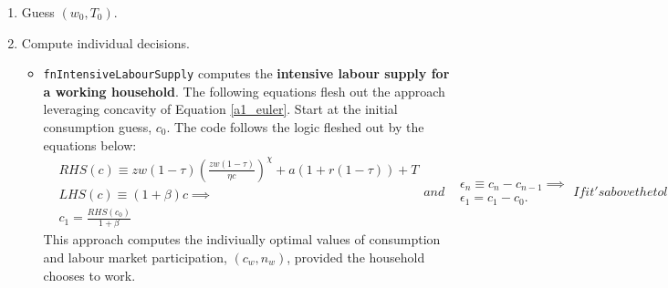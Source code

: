 \begin{enumerate}
    \item Guess $\left(w_0,T_0 \right)$.
    \item Compute individual decisions. 
    \begin{itemize}
        \item \texttt{fnIntensiveLabourSupply} computes the \textcolor{BurntOrange}{\textbf{intensive labour supply for a working household}}. 
        The following equations flesh out the approach leveraging concavity of Equation \eqref{a1_euler}.
        Start at the initial consumption guess, $c_0$. The code follows the logic fleshed out by the equations below:
        \begin{subequations}
            \begin{align}
                & RHS\left(c \right)\equiv z w(1-\tau) \left( \frac{z w(1-\tau)}{\eta c}\right)^\chi +a(1+r(1-\tau))+T \\
                & LHS\left(c \right) \equiv (1+\beta) c \implies \\
                & c_1 = \frac{RHS\left(c_0 \right)}{1+\beta}
            \end{align}
            and 
            \begin{align}
                & \epsilon_n \equiv c_{n} - c_{n-1} \implies \\
                &\epsilon_1 = c_1 - c_0. 
            \end{align}
            If it's above the tolerance level, then repeat until it works:
            \begin{align}
                & c_n = \frac{RHS\left(c_{n-1} \right)}{1+\beta} \implies \\
                & \epsilon_n =c_{n} - c_{n-1}.
            \end{align}
        \end{subequations}
        This approach computes the indiviually optimal values of consumption and labour market participation, $\left(c_w, n_w \right)$, provided the household chooses to work.\vspace{3mm}


\end{itemize}
\end{enumerate}

